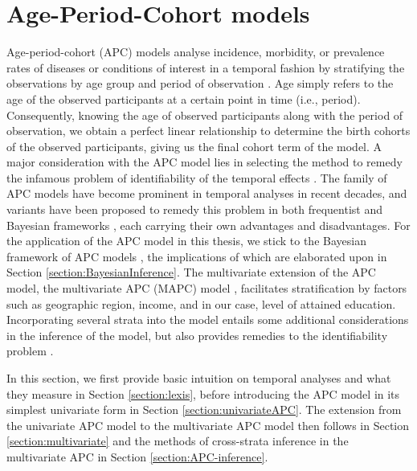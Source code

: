 \section{Age-Period-Cohort models}\label{section:Age-period-cohort-models}
Age-period-cohort (APC) models analyse incidence, morbidity, or prevalence rates of diseases or conditions of interest in a temporal fashion by stratifying the observations by age group and period of observation \citep{APC-OLD, APC-OLD-2, APC-OLD-3}. Age simply refers to the age of the observed participants at a certain point in time (i.e., period). Consequently, knowing the age of observed participants along with the period of observation, we obtain a perfect linear relationship to determine the birth cohorts of the observed participants, giving us the final cohort term of the model. A major consideration with the APC model lies in selecting the method to remedy the infamous problem of identifiability of the temporal effects \citep{APC-wakefield}. The family of APC models have become prominent in temporal analyses in recent decades, and variants have been proposed to remedy this problem in both frequentist \citep{Rosenberg2023} and Bayesian frameworks \citep{berzuini1993bayesian,berzuini1994bayesian}, each carrying their own advantages and disadvantages. For the application of the APC model in this thesis, we stick to the Bayesian framework of APC models \citep{APC-Bayesian-Yang,APC-Bayesian-Held}, the implications of which are elaborated upon in Section \ref{section:BayesianInference}. The multivariate extension of the APC model, the multivariate APC (MAPC) model \citep{hansell2003copd, jacobsen2004women}, facilitates stratification by factors such as geographic region, income, and in our case, level of attained education. Incorporating several strata into the model entails some additional considerations in the inference of the model, but also provides remedies to the identifiability problem \citep{APC-Bayesian-Andrea}.

In this section, we first provide basic intuition on temporal analyses and what they measure in Section \ref{section:lexis}, before introducing the APC model in its simplest univariate form in Section \ref{section:univariateAPC}. The extension from the univariate APC model to the multivariate APC model then follows in Section \ref{section:multivariate} and the methods of cross-strata inference in the multivariate APC in Section \ref{section:APC-inference}.

